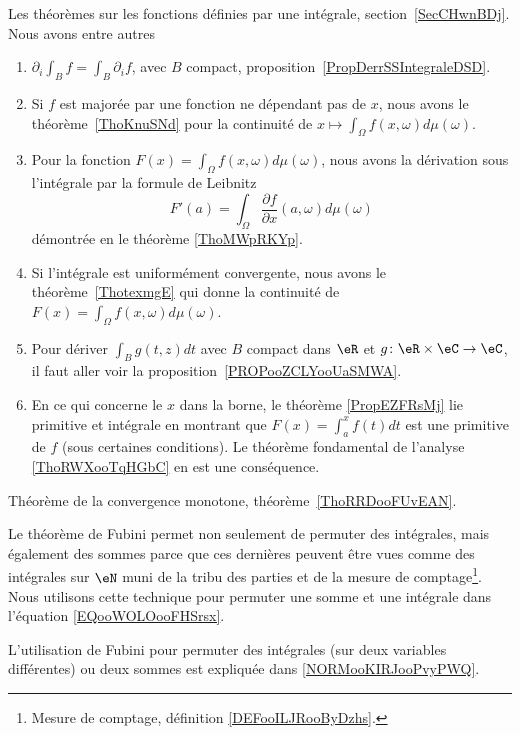 \begin{description}
    \item[Fonctions définies par une intégrale]
        Les théorèmes sur les fonctions définies par une intégrale, section~\ref{SecCHwnBDj}. Nous avons entre autres
        \begin{enumerate}
            \item
                \( \partial_i\int_Bf=\int_B\partial_if\), avec \( B\) compact, proposition~\ref{PropDerrSSIntegraleDSD}.
            \item
                Si \( f\) est majorée par une fonction ne dépendant pas de \( x\), nous avons le théorème~\ref{ThoKnuSNd} pour la continuité de \( x\mapsto \int_{\Omega}f(x,\omega)d\mu(\omega)\).
            \item
                Pour la fonction $F(x)=\int_{\Omega}f(x,\omega)d\mu(\omega)$, nous avons la dérivation sous l'intégrale par la formule de Leibnitz
                \begin{equation}
                    F'(a)=\int_{\Omega}\frac{ \partial f }{ \partial x }(a,\omega)d\mu(\omega)
                \end{equation}
                démontrée en le théorème \ref{ThoMWpRKYp}.
            \item
                Si l'intégrale est uniformément convergente, nous avons le théorème~\ref{ThotexmgE} qui donne la continuité de $F(x)=\int_{\Omega}f(x,\omega)d\mu(\omega)$.
            \item
                Pour dériver \( \int_Bg(t,z)dt\) avec \( B\) compact dans \( \eR\) et \( g\colon \eR\times \eC\to \eC\), il faut aller voir la proposition~\ref{PROPooZCLYooUaSMWA}.
            \item
                En ce qui concerne le \( x\) dans la borne, le théorème \ref{PropEZFRsMj} lie primitive et intégrale en montrant que \( F(x)=\int_a^xf(t)dt\) est une primitive de \( f\) (sous certaines conditions). Le théorème fondamental de l'analyse \ref{ThoRWXooTqHGbC} en est une conséquence.
        \end{enumerate}
    \item[Convergence monotone]
        Théorème de la convergence monotone, théorème~\ref{ThoRRDooFUvEAN}.
    \item[Fubini]
        Le théorème de Fubini permet non seulement de permuter des intégrales, mais également des sommes parce que ces dernières peuvent être vues comme des intégrales sur \( \eN\) muni de la tribu des parties et de la mesure de comptage\footnote{Mesure de comptage, définition \ref{DEFooILJRooByDzhs}.}. Nous utilisons cette technique pour permuter une somme et une intégrale dans l'équation \eqref{EQooWOLOooFHSrsx}.
    \item
        L'utilisation de Fubini pour permuter des intégrales (sur deux variables différentes) ou deux sommes est expliquée dans \ref{NORMooKIRJooPvyPWQ}. 


\end{description}
